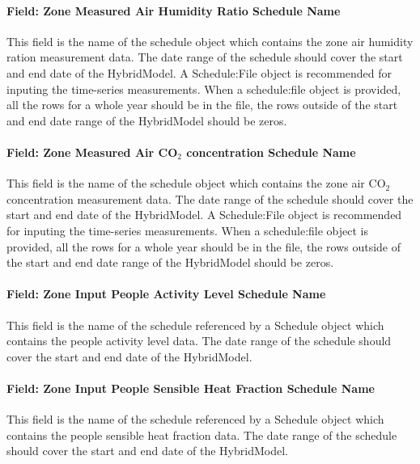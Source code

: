 \paragraph{Field: Zone Measured Air Humidity Ratio Schedule Name}\label{field-zone-measured-air-humidity-ratio-schedule-name-hm}

This field is the name of the schedule object which contains the zone air humidity ration measurement data. The date range of the schedule should cover the start and end date of the HybridModel. A Schedule:File object is recommended for inputing the time-series measurements. When a schedule:file object is provided, all the rows for a whole year should be in the file, the rows outside of the start and end date range of the HybridModel should be zeros.

\paragraph{Field: Zone Measured Air CO$_2$ concentration Schedule Name}\label{field-zone-measured-air-co2-concentration-schedule-name-hm}

This field is the name of the schedule object which contains the zone air CO$_2$ concentration measurement data. The date range of the schedule should cover the start and end date of the HybridModel. A Schedule:File object is recommended for inputing the time-series measurements. When a schedule:file object is provided, all the rows for a whole year should be in the file, the rows outside of the start and end date range of the HybridModel should be zeros.

\paragraph{Field: Zone Input People Activity Level Schedule Name}\label{field-zone-input-people-activity-schedule-name-hm}

This field is the name of the schedule referenced by a Schedule object which contains the people activity level data. The date range of the schedule should cover the start and end date of the HybridModel.

\paragraph{Field: Zone Input People Sensible Heat Fraction Schedule Name}\label{field-zone-input-people-sensible-heat-fraction-schedule-name-hm}

This field is the name of the schedule referenced by a Schedule object which contains the people sensible heat fraction data. The date range of the schedule should cover the start and end date of the HybridModel.

